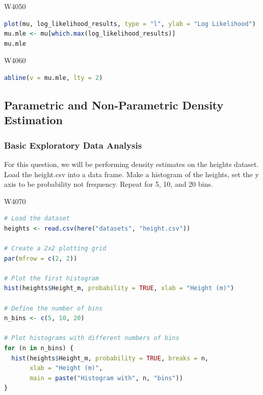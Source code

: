 
\begin{ocg}{}{W405}{0}
\begin{lstlisting}[language = R]
plot(mu, log_likelihood_results, type = "l", ylab = "Log Likelihood")
mu.mle <- mu[which.max(log_likelihood_results)]
mu.mle
\end{lstlisting}
\end{ocg}


\begin{ocg}{}{W406}{0}
\begin{lstlisting}[language = R]
abline(v = mu.mle, lty = 2)
\end{lstlisting}
\end{ocg}

\subsection{Parametric and Non-Parametric Density Estimation}

\subsubsection{Basic Exploratory Data Analysis}

\indent 

For this question, we will be performing density estimates on the heights dataset. Load the height.csv into a data frame. Make a histogram of the heights, set the y axis to be probability not frequency. Repeat for 5, 10, and 20 bins.


\begin{ocg}{}{W407}{0}
\begin{lstlisting}[language = R]
# Load the dataset
heights <- read.csv(here("datasets", "height.csv"))

# Create a 2x2 plotting grid
par(mfrow = c(2, 2))

# Plot the first histogram
hist(heights$Height_m, probability = TRUE, xlab = "Height (m)")

# Define the number of bins
n_bins <- c(5, 10, 20)

# Plot histograms with different numbers of bins
for (n in n_bins) {
  hist(heights$Height_m, probability = TRUE, breaks = n,
       xlab = "Height (m)",
       main = paste("Histogram with", n, "bins"))
}
\end{lstlisting}
\end{ocg}

